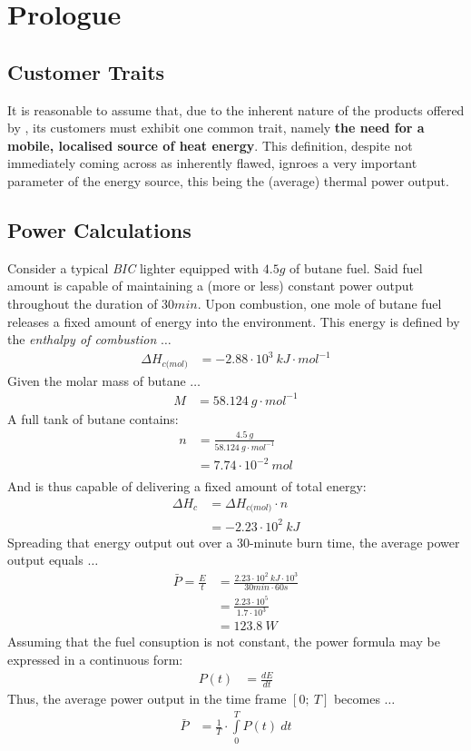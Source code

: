 \section{Prologue}
\subsection{Customer Traits}
It is reasonable to assume that, due to the inherent nature of the products offered by \fw, its customers must
exhibit one common trait, namely \textbf{the need for a mobile, localised source of heat energy}.
This definition, despite not immediately coming across as inherently flawed, ignroes a very important parameter of the
energy source, this being the (average) thermal power output. \\[\baselineskip]
\subsection{Power Calculations}
Consider a typical \textit{BIC} lighter equipped with $4.5g$ of butane fuel. Said fuel amount is capable of maintaining
a (more or less) constant power output throughout the duration of $30min$.
Upon combustion, one mole of butane fuel releases a fixed amount of energy into the environment. This energy is defined
by the \textit{enthalpy of combustion} $\dots$
\begin{align*}
	\Delta H_{c\textit{(mol)}} &= -2.88 \cdot 10^3 \: kJ \cdot mol^{-1}
\end{align*}
Given the molar mass of butane $\dots$
\begin{align*}
	M &= 58.124 \: g \cdot mol^{-1}
\end{align*}
A full tank of butane contains:
\begin{align*}
	n &= \frac{4.5 \: g}{58.124 \: g \cdot mol^{-1}} \\
	  &= 7.74 \cdot 10^{-2} \: mol \\
\end{align*}
And is thus capable of delivering a fixed amount of total energy:
\begin{align*}
	\Delta H_c &= \Delta H_{c\textit{(mol)}} \cdot n \\
		   &= -2.23 \cdot 10^2 \: kJ
\end{align*}
Spreading that energy output out over a $30$-minute burn time, the average power output equals $\dots$
\begin{align*}
	\bar{P} = \frac{E}{t} &= \frac{2.23 \cdot 10^2 \: kJ \cdot 10^3}{30min \cdot 60s} \\
			&= \frac{2.23 \cdot 10^5}{1.7 \cdot 10^3} \\
			&= 123.8 \: W
\end{align*}
Assuming that the fuel consuption is not constant, the power formula may be expressed in a continuous form:
\begin{align*}
	P(t) &= \frac{dE}{dt}
\end{align*}
Thus, the average power output in the time frame $[0; \: T]$ becomes $\dots$
\begin{align*}
	\bar{P} &= \frac{1}{T} \cdot \int\limits_{0}^{T} P(t) \: dt
\end{align*}

